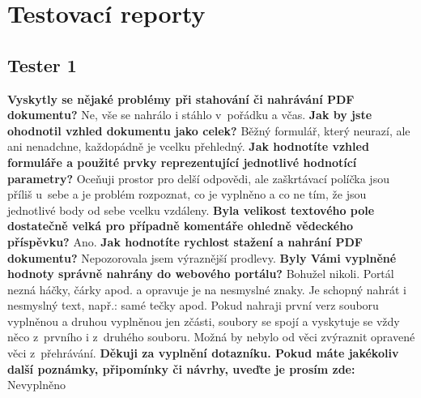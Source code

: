 \chapter{Testovací reporty}
\label{chap:testovaci_reporty}

\section{Tester 1}

\textbf{Vyskytly se nějaké problémy při stahování či nahrávání PDF dokumentu?}
\newline
Ne, vše se nahrálo i stáhlo v~pořádku a včas.
\newline
\newline
\textbf{Jak by jste ohodnotil vzhled dokumentu jako celek?}
\newline
Běžný formulář, který neurazí, ale ani nenadchne, každopádně je vcelku přehledný.
\newline
\newline
\textbf{Jak hodnotíte vzhled formuláře a použité prvky reprezentující jednotlivé hodnotící parametry?}
\newline
Oceňuji prostor pro delší odpovědi, ale zaškrtávací políčka jsou příliš u~sebe a je problém rozpoznat, co je vyplněno a co ne tím, že jsou jednotlivé body od sebe vcelku vzdáleny.
\newline
\newline
\textbf{Byla velikost textového pole dostatečně velká pro případně komentáře ohledně vědeckého příspěvku?}
\newline
Ano.
\newline
\newline
\textbf{Jak hodnotíte rychlost stažení a nahrání PDF dokumentu?} 
\newline
Nepozorovala jsem výraznější prodlevy.
\newline
\newline
\textbf{Byly Vámi vyplněné hodnoty správně nahrány do webového portálu?}
\newline
Bohužel nikoli. Portál nezná háčky, čárky apod. a opravuje je na nesmyslné znaky. Je schopný nahrát i nesmyslný text, např.: samé tečky apod. Pokud nahraji první verz souboru vyplněnou a druhou vyplněnou jen zčásti, soubory se spojí a vyskytuje se vždy něco z~prvního i z~druhého souboru. Možná by nebylo od věci zvýraznit opravené věci z~přehrávání.
\newline
\newline
\textbf{Děkuji za vyplnění dotazníku. Pokud máte jakékoliv další poznámky, připomínky či návrhy, uveďte je prosím zde:}
\newline
Nevyplněno
\newpage 

